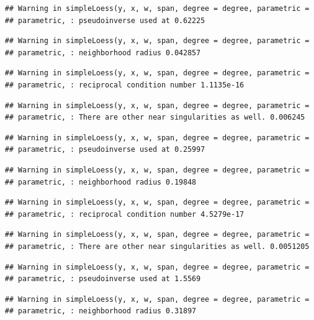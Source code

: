 \documentclass[]{article}
\begin{document}
\begin{verbatim}
## Warning in simpleLoess(y, x, w, span, degree = degree, parametric =
## parametric, : pseudoinverse used at 0.62225
\end{verbatim}

\begin{verbatim}
## Warning in simpleLoess(y, x, w, span, degree = degree, parametric =
## parametric, : neighborhood radius 0.042857
\end{verbatim}

\begin{verbatim}
## Warning in simpleLoess(y, x, w, span, degree = degree, parametric =
## parametric, : reciprocal condition number 1.1135e-16
\end{verbatim}

\begin{verbatim}
## Warning in simpleLoess(y, x, w, span, degree = degree, parametric =
## parametric, : There are other near singularities as well. 0.006245
\end{verbatim}

\begin{verbatim}
## Warning in simpleLoess(y, x, w, span, degree = degree, parametric =
## parametric, : pseudoinverse used at 0.25997
\end{verbatim}

\begin{verbatim}
## Warning in simpleLoess(y, x, w, span, degree = degree, parametric =
## parametric, : neighborhood radius 0.19848
\end{verbatim}

\begin{verbatim}
## Warning in simpleLoess(y, x, w, span, degree = degree, parametric =
## parametric, : reciprocal condition number 4.5279e-17
\end{verbatim}

\begin{verbatim}
## Warning in simpleLoess(y, x, w, span, degree = degree, parametric =
## parametric, : There are other near singularities as well. 0.0051205
\end{verbatim}

\begin{verbatim}
## Warning in simpleLoess(y, x, w, span, degree = degree, parametric =
## parametric, : pseudoinverse used at 1.5569
\end{verbatim}

\begin{verbatim}
## Warning in simpleLoess(y, x, w, span, degree = degree, parametric =
## parametric, : neighborhood radius 0.31897
\end{verbatim}
\end{document}
